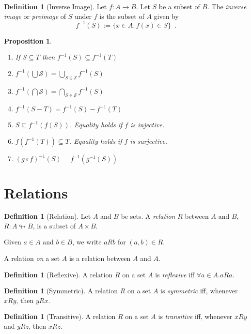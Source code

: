 \documentclass{book}
\newtheorem{prop}[ax]{Proposition}
\theoremstyle{definition}
\newtheorem{df}[ax]{Definition}
\newcommand{\inv}[1]{\ensuremath{{#1}^{-1}}}
\begin{document}
\begin{df}[Inverse Image]
Let $f : A \rightarrow B$. Let $S$ be a subset of $B$. The \emph{inverse image} or \emph{preimage} of $S$ under $f$ is the subset of $A$ given by
\[ \inv{f}(S) := \{ x \in A : f(x) \in S \} \enspace . \]
\end{df}

\begin{prop}
\begin{enumerate}
\item If $S \subseteq T$ then $\inv{f}(S) \subseteq \inv{f}(T)$
\item $\inv{f}(\bigcup \mathcal{S}) = \bigcup_{S \in \mathcal{S}} \inv{f}(S)$
\item $\inv{f}(\bigcap \mathcal{S}) = \bigcap_{S \in \mathcal{S}} \inv{f}(S)$
\item $\inv{f}(S - T) = \inv{f}(S) - \inv{f}(T)$
\item $S \subseteq \inv{f}(f(S))$. Equality holds if $f$ is injective.
\item $f(\inv{f}(T)) \subseteq T$. Equality holds if $f$ is surjective.
\item $\inv{(g \circ f)}(S) = \inv{f}(\inv{g}(S))$
\end{enumerate}
\end{prop}

\section{Relations} %

\begin{df}[Relation]
Let $A$ and $B$ be sets. A \emph{relation} $R$ between $A$ and $B$, $R : A \looparrowright B$, is a subset of $A \times B$.

Given $a \in A$ and $b \in B$, we write $aRb$ for $(a,b) \in R$.

A relation \emph{on} a set $A$ is a relation between $A$ and $A$.
\end{df}

\begin{df}[Reflexive]
A relation $R$ on a set $A$ is \emph{reflexive} iff $\forall a \in A. aRa$.
\end{df}

\begin{df}[Symmetric]
A relation $R$ on a set $A$ is \emph{symmetric} iff, whenever $xRy$, then $yRx$.
\end{df}

\begin{df}[Transitive]
A relation $R$ on a set $A$ is \emph{transitive} iff, whenever $xRy$ and $yRz$, then $xRz$.
\end{df}
\end{document}
